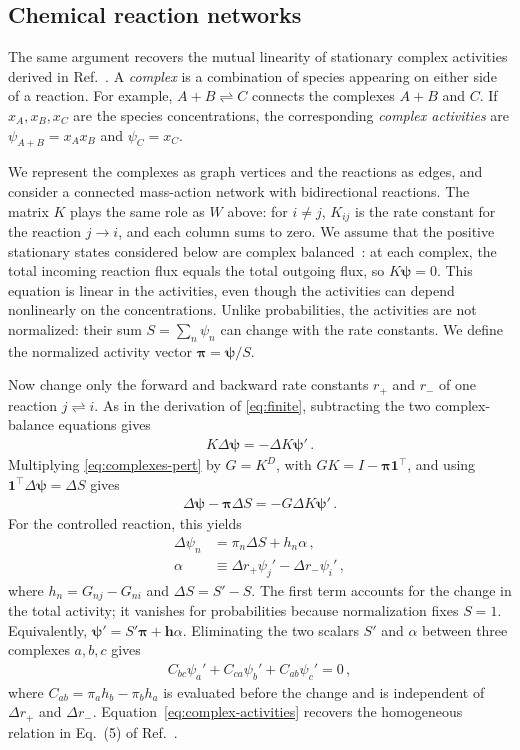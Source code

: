 \documentclass[
  reprint,
  superscriptaddress,
  amsmath,
  amssymb,
  aps,
  pre,
  longbibliography
]{revtex4-2}
\begin{document}
\subsection{Chemical reaction networks}

The same argument recovers the mutual linearity of stationary complex
activities derived in Ref.~\cite{HarunariFiusaPolettini2026}.
A \emph{complex} is a combination of species appearing on either side
of a reaction. For example, $A+B\rightleftharpoons C$ connects the
complexes $A+B$ and $C$. If $x_A,x_B,x_C$ are the species
concentrations, the corresponding \emph{complex activities} are
$\psi_{A+B}=x_Ax_B$ and $\psi_C=x_C$.

We represent the complexes as graph vertices and the reactions as
edges, and consider a connected mass-action network with bidirectional
reactions.
The matrix $K$ plays the same role as $W$ above: for $i\ne j$,
$K_{ij}$ is the rate constant for the reaction $j\to i$, and each
column sums to zero.
We assume that the positive stationary states considered below are complex
balanced~\cite{MarehalliSrinivas2023}: at each complex, the total
incoming reaction flux equals the total outgoing flux, so
$K\bm\psi=0$.
This equation is linear in the activities, even though the activities
can depend nonlinearly on the concentrations. Unlike probabilities,
the activities are not normalized: their sum $S=\sum_n\psi_n$ can
change with the rate constants. We define the normalized activity
vector $\bm\pi=\bm\psi/S$.

Now change only the forward and backward rate constants $r_+$ and
$r_-$ of one reaction $j\rightleftharpoons i$. As in the derivation
of \cref{eq:finite}, subtracting the two complex-balance equations
gives 
\begin{align}
    K\Delta\bm\psi=-\Delta K\bm\psi'\,.
    \label{eq:complexes-pert}
\end{align}
Multiplying \cref{eq:complexes-pert} by $G=K^D$, with
$GK=I-\bm\pi\bm1^\intercal$, and using
$\bm1^\intercal\Delta\bm\psi=\Delta S$ gives
\begin{align}
    \Delta\bm\psi-\bm\pi\Delta S=-G\Delta K\bm\psi'\,.
\end{align}
For the controlled reaction, this yields
\begin{align}
    \Delta\psi_n&=\pi_n\Delta S+h_n\alpha\,,\nonumber\\
    \alpha&\equiv\Delta r_+\psi_j'-\Delta r_-\psi_i'\,,
    \label{eq:complex-response}
\end{align}
where $h_n=G_{nj}-G_{ni}$ and $\Delta S=S'-S$.
The first term accounts for the change in the total activity; it
vanishes for probabilities because normalization fixes $S=1$.
Equivalently, $\bm\psi'=S'\bm\pi+\bm h\alpha$.
Eliminating the two scalars $S'$ and $\alpha$ between three complexes
$a,b,c$ gives
\begin{align}
    C_{bc}\psi_a'+C_{ca}\psi_b'+C_{ab}\psi_c'=0\,,
    \label{eq:complex-activities}
\end{align}
where $C_{ab}=\pi_a h_b-\pi_b h_a$ is evaluated before the change
and is independent of $\Delta r_+$ and $\Delta r_-$.
Equation~\eqref{eq:complex-activities} recovers the homogeneous
relation in Eq.~(5) of Ref.~\cite{HarunariFiusaPolettini2026}.
\end{document}
